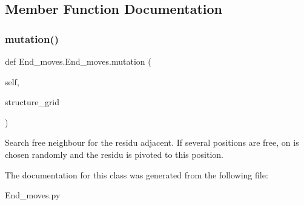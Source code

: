\subsection{Member Function Documentation}
\mbox{\label{classEnd__moves_1_1End__moves_a398d49afd0af75f9dd3306d66ab4f244}} 
\subsubsection{\texorpdfstring{mutation()}{mutation()}}
{\footnotesize\ttfamily def End\+\_\+moves.\+End\+\_\+moves.\+mutation (\begin{DoxyParamCaption}\item[{}]{self,  }\item[{}]{structure\+\_\+grid }\end{DoxyParamCaption})}

\begin{DoxyVerb}Search free neighbour for the residu adjacent.
    If several positions are free, on
    is chosen randomly and the residu is pivoted to this position.
\end{DoxyVerb}
 

The documentation for this class was generated from the following file\+:\begin{DoxyCompactItemize}
\item 
End\+\_\+moves.\+py\end{DoxyCompactItemize}
